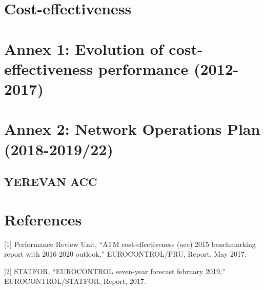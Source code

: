 \documentclass[]{article}
\begin{document}
\newpage

\hypertarget{cost-effectiveness-1}{%
\section{Cost-effectiveness}\label{cost-effectiveness-1}}

\newpage

\hypertarget{annex-1-evolution-of-cost-effectiveness-performance-2012-2017}{%
\section{Annex 1: Evolution of cost-effectiveness performance (2012-2017)}\label{annex-1-evolution-of-cost-effectiveness-performance-2012-2017}}

\newpage

\hypertarget{annex-2-network-operations-plan-2018-201922}{%
\section{Annex 2: Network Operations Plan (2018-2019/22)}\label{annex-2-network-operations-plan-2018-201922}}

\hypertarget{yerevan-acc}{%
\subsection{YEREVAN ACC}\label{yerevan-acc}}

\newpage

\hypertarget{references}{%
\section*{References}\label{references}}

\hypertarget{refs}{}
\leavevmode\hypertarget{ref-pru:ace-report-2015}{}%
{[}1{]} Performance Review Unit, ``ATM cost-effectiveness (ace) 2015 benchmarking report with 2016-2020 outlook,'' EUROCONTROL/PRU, Report, May 2017.

\leavevmode\hypertarget{ref-7year-forecast-2019}{}%
{[}2{]} STATFOR, ``EUROCONTROL seven-year forecast february 2019,'' EUROCONTROL/STATFOR, Report, 2017.
\end{document}
